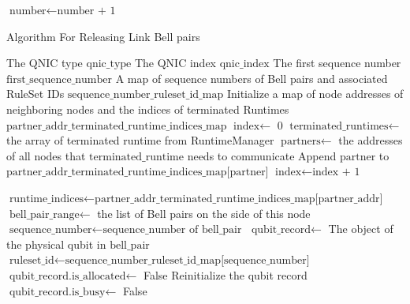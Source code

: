         \begin{algorithm}[H]    
          \begin{minipage}{0.8\linewidth}               
          \begin{algorithmic}[1]
          \EndIf
        \EndIf
        \State $\text{number} \gets \text{number + 1}$
      \EndFor
    \EndFor
  \end{algorithmic}
\end{minipage}
\end{algorithm}

\begin{algorithm}[H]  
  \begin{minipage}{0.8\linewidth}
  \caption{Algorithm For Releasing Link Bell pairs}                 
  \begin{algorithmic}[1]
    \Require The QNIC type $\text{qnic\_type}$
    \Require The QNIC index $\text{qnic\_index}$
    \Require The first sequence number $\text{first\_sequence\_number}$
    \Require A map of sequence numbers of Bell pairs and associated RuleSet IDs $\text{sequence\_number\_ruleset\_id\_map}$
    \State Initialize a map of node addresses of neighboring nodes and the indices of terminated Runtimes $\text{partner\_addr\_terminated\_runtime\_indices\_map}$
    \State $\text{index} \gets$ 0
    \State $\text{terminated\_runtimes} \gets$ the array of terminated runtime from RuntimeManager
      \State $\text{partners} \gets$ the addresses of all nodes that $\text{terminated\_runtime}$ needs to communicate
        \State Append $\text{partner}$ to $\text{partner\_addr\_terminated\_runtime\_indices\_map[partner]}$
      \EndFor
      \State $\text{index} \gets \text{index + 1}$
    \EndFor

      \State $\text{runtime\_indices} \gets \text{partner\_addr\_terminated\_runtime\_indices\_map[partner\_addr]}$
      \State $\text{bell\_pair\_range} \gets$ the list of Bell pairs on the side of this node
        \State $\text{sequence\_number} \gets \text{sequence\_number of bell\_pair}$
          \State $\text{qubit\_record} \gets$ The object of the physical qubit in $\text{bell\_pair}$
          \State $\text{ruleset\_id} \gets \text{sequence\_number\_ruleset\_id\_map[sequence\_number]}$
            \State $\text{qubit\_record.is\_allocated} \gets$ False
            \State Reinitialize the qubit record
                \State $\text{qubit\_record.is\_busy} \gets$ False
              \EndIf
            \end{algorithmic}
          \end{minipage}
          \end{algorithm}

